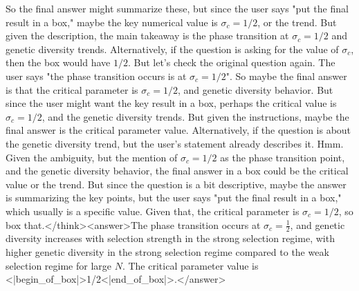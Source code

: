 So the final answer might summarize these, but since the user says "put the final result in a box," maybe the key numerical value is \( \sigma_c = 1/2 \), or the trend. But given the description, the main takeaway is the phase transition at \( \sigma_c = 1/2 \) and genetic diversity trends. Alternatively, if the question is asking for the value of \( \sigma_c \), then the box would have \( 1/2 \). But let's check the original question again. The user says "the phase transition occurs is at \( \sigma_c = 1/2 \)". So maybe the final answer is that the critical parameter is \( \sigma_c = 1/2 \), and genetic diversity behavior. But since the user might want the key result in a box, perhaps the critical value is \( \sigma_c = 1/2 \), and the genetic diversity trends. But given the instructions, maybe the final answer is the critical parameter value. Alternatively, if the question is about the genetic diversity trend, but the user's statement already describes it. Hmm. Given the ambiguity, but the mention of \( \sigma_c = 1/2 \) as the phase transition point, and the genetic diversity behavior, the final answer in a box could be the critical value or the trend. But since the question is a bit descriptive, maybe the answer is summarizing the key points, but the user says "put the final result in a box," which usually is a specific value. Given that, the critical parameter is \( \sigma_c = 1/2 \), so box that.</think><answer>The phase transition occurs at \( \sigma_c = \frac{1}{2} \), and genetic diversity increases with selection strength in the strong selection regime, with higher genetic diversity in the strong selection regime compared to the weak selection regime for large \( N \). The critical parameter value is <|begin_of_box|>1/2<|end_of_box|>.</answer>